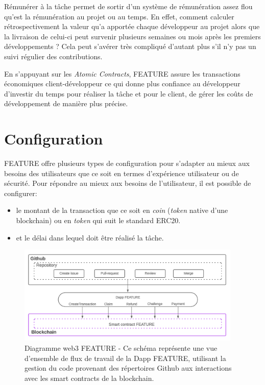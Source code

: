 \documentclass[
	a4paper, %
	10pt, %
	unnumberedsections, %
	twoside, %
]{LTJournalArticle}
\begin{document}
Rémunérer à la tâche permet de sortir d'un système de rémunération assez flou qu'est la rémunération au projet ou au temps. En effet, comment calculer rétrospectivement la valeur qu'a apportée chaque développeur au projet alors que la livraison de celui-ci peut survenir plusieurs semaines ou mois après les premiers développements ? Cela peut s'avérer très compliqué d'autant plus s'il n'y pas un suivi régulier des contributions.

En s'appuyant sur les \emph{Atomic Contracts}, FEATURE assure les transactions économiques client-développeur ce qui donne plus confiance au développeur d'investir du temps pour réaliser la tâche et pour le client, de gérer les coûts de développement de manière plus précise.


\section{Configuration}

FEATURE offre plusieurs types de configuration pour s'adapter au mieux aux besoins des utilisateurs que ce soit en termes d'expérience utilisateur ou de sécurité. Pour répondre au mieux aux besoins de l'utilisateur, il est possible de configurer:

\begin{itemize}
\item
  le montant de la transaction que ce soit en \emph{coin} (\emph{token} native d'une blockchain) ou en \emph{token} qui suit le standard ERC20.
\item
  et le délai dans lequel doit être réalisé la tâche.
\end{itemize}

\begin{figure}[ht]
  \centering
  \includegraphics[width=0.95\textwidth]{media/diagram_web3_Feature.png}
  \caption{Diagramme web3 FEATURE - Ce schéma représente une vue d'ensemble de flux de travail de la Dapp FEATURE, utilisant la gestion du code provenant des répertoires Github aux interactions avec les smart contracts de la blockchain.}
  \label{fig:web3 diagram}
\end{figure}
\end{document}
